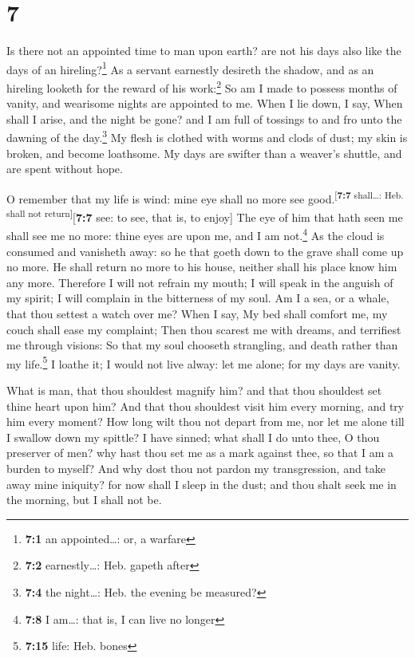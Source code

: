 \hypertarget{section-6}{%
\section{7}\label{section-6}}

 Is there not an appointed time to man upon earth? are not
his days also like the days of an hireling?\footnote{\textbf{7:1} an
  appointed\ldots: or, a warfare}  As a servant earnestly
desireth the shadow, and as an hireling looketh for the reward of his
work:\footnote{\textbf{7:2} earnestly\ldots: Heb. gapeth after}
 So am I made to possess months of vanity, and wearisome
nights are appointed to me.  When I lie down, I say, When
shall I arise, and the night be gone? and I am full of tossings to and
fro unto the dawning of the day.\footnote{\textbf{7:4} the night\ldots:
  Heb. the evening be measured?}  My flesh is clothed with
worms and clods of dust; my skin is broken, and become loathsome.
 My days are swifter than a weaver's shuttle, and are
spent without hope.

 O remember that my life is wind: mine eye shall no more
see good.\textsuperscript{{[}\textbf{7:7} shall\ldots: Heb. shall not
return{]}}{[}\textbf{7:7} see: to see, that is, to enjoy{]}
 The eye of him that hath seen me shall see me no more:
thine eyes are upon me, and I am not.\footnote{\textbf{7:8} I am\ldots:
  that is, I can live no longer}  As the cloud is consumed
and vanisheth away: so he that goeth down to the grave shall come up no
more.  He shall return no more to his house, neither
shall his place know him any more.  Therefore I will not
refrain my mouth; I will speak in the anguish of my spirit; I will
complain in the bitterness of my soul.  Am I a sea, or a
whale, that thou settest a watch over me?  When I say, My
bed shall comfort me, my couch shall ease my complaint; 
Then thou scarest me with dreams, and terrifiest me through visions:
 So that my soul chooseth strangling, and death rather
than my life.\footnote{\textbf{7:15} life: Heb. bones}  I
loathe it; I would not live alway: let me alone; for my days are vanity.

 What is man, that thou shouldest magnify him? and that
thou shouldest set thine heart upon him?  And that thou
shouldest visit him every morning, and try him every moment?
 How long wilt thou not depart from me, nor let me alone
till I swallow down my spittle?  I have sinned; what
shall I do unto thee, O thou preserver of men? why hast thou set me as a
mark against thee, so that I am a burden to myself?  And
why dost thou not pardon my transgression, and take away mine iniquity?
for now shall I sleep in the dust; and thou shalt seek me in the
morning, but I shall not be.

